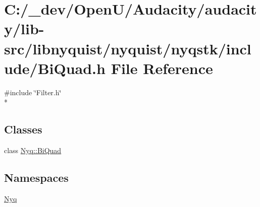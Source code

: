 \hypertarget{lib-src_2libnyquist_2nyquist_2nyqstk_2include_2_bi_quad_8h}{}\section{C\+:/\+\_\+dev/\+Open\+U/\+Audacity/audacity/lib-\/src/libnyquist/nyquist/nyqstk/include/\+Bi\+Quad.h File Reference}
\label{lib-src_2libnyquist_2nyquist_2nyqstk_2include_2_bi_quad_8h}
{\ttfamily \#include \char`\"{}Filter.\+h\char`\"{}}\\*
\subsection*{Classes}
\begin{DoxyCompactItemize}
\item 
class \hyperlink{class_nyq_1_1_bi_quad}{Nyq\+::\+Bi\+Quad}
\end{DoxyCompactItemize}
\subsection*{Namespaces}
\begin{DoxyCompactItemize}
\item 
 \hyperlink{namespace_nyq}{Nyq}
\end{DoxyCompactItemize}
